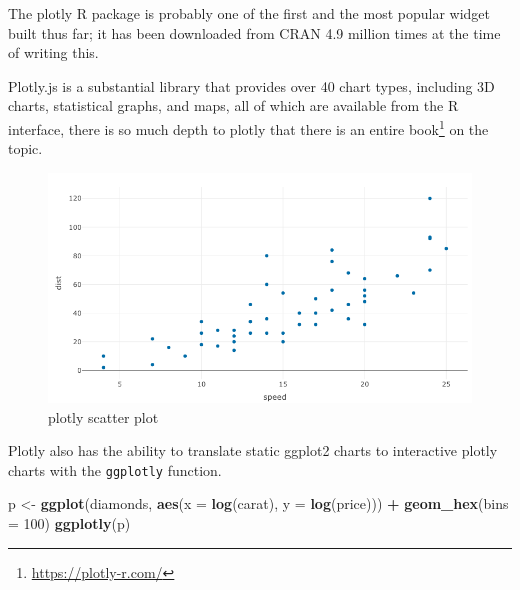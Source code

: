 \documentclass[10pt,]{krantz}
\makeatletter
\newenvironment{Shaded}{\begin{snugshade}}{\end{snugshade}}
\newcommand{\DataTypeTok}[1]{\textcolor[rgb]{0.27,0.27,0.27}{#1}}
\newcommand{\DecValTok}[1]{\textcolor[rgb]{0.06,0.06,0.06}{#1}}
\newcommand{\KeywordTok}[1]{\textcolor[rgb]{0.27,0.27,0.27}{\textbf{#1}}}
\newcommand{\NormalTok}[1]{#1}
\newcommand{\OperatorTok}[1]{\textcolor[rgb]{0.43,0.43,0.43}{\textbf{#1}}}
\newcommand{\StringTok}[1]{\textcolor[rgb]{0.5,0.5,0.5}{#1}}
\renewcommand{\href}[2]{#2\footnote{\url{#1}}}
\newenvironment{kframe}{%
\medskip{}
\setlength{\fboxsep}{.8em}
 \def\at@end@of@kframe{}%
 \ifinner\ifhmode%
  \def\at@end@of@kframe{\end{minipage}}%
  \begin{minipage}{\columnwidth}%
 \fi\fi%
 \def\FrameCommand##1{\hskip\@totalleftmargin \hskip-\fboxsep
 \colorbox{shadecolor}{##1}\hskip-\fboxsep
     \hskip-\linewidth \hskip-\@totalleftmargin \hskip\columnwidth}%
 \MakeFramed {\advance\hsize-\width
   \@totalleftmargin\z@ \linewidth\hsize
   \@setminipage}}%
 {\par\unskip\endMakeFramed%
 \at@end@of@kframe}
\renewenvironment{Shaded}{\begin{kframe}}{\end{kframe}}
\makeatother
\begin{document}
The plotly \citep{R-plotly} R package is probably one of the first and the most popular widget built thus far; it has been downloaded from CRAN 4.9 million times at the time of writing this.

Plotly.js is a substantial library that provides over 40 chart types, including 3D charts, statistical graphs, and maps, all of which are available from the R interface, there is so much depth to plotly that there is an entire \href{https://plotly-r.com/}{book} on the topic.

\begin{Shaded}
\end{Shaded}

\begin{figure}[H]

{\centering \includegraphics[width=1\linewidth]{images/03-plotly-scatter} 

}

\caption{plotly scatter plot}\label{fig:plotly-scatter-diagram}
\end{figure}

Plotly also has the ability to translate static ggplot2 \citep{R-ggplot2} charts to interactive plotly charts with the \texttt{ggplotly} function.

\begin{Shaded}
\begin{Highlighting}[]
\NormalTok{p <-}\StringTok{ }\KeywordTok{ggplot}\NormalTok{(diamonds, }\KeywordTok{aes}\NormalTok{(}\DataTypeTok{x =} \KeywordTok{log}\NormalTok{(carat), }\DataTypeTok{y =} \KeywordTok{log}\NormalTok{(price))) }\OperatorTok{+}\StringTok{ }
\StringTok{  }\KeywordTok{geom_hex}\NormalTok{(}\DataTypeTok{bins =} \DecValTok{100}\NormalTok{)}
\KeywordTok{ggplotly}\NormalTok{(p)}
\end{Highlighting}
\end{Shaded}
\end{document}
